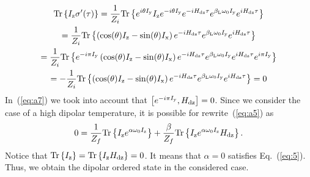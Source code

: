 \begin{multline}
    \label{eq:a7}
    \mathrm{Tr} \left\{ I_\mathrm{z} \sigma'(\tau) \right\}
    =  \dfrac{1}{Z_{i}} \mathrm{Tr} \left\{ 
        e^{i \theta I_\mathrm{y}} I_\mathrm{z} e^{-i \theta I_\mathrm{y}}
        e^{-i H_\mathrm{dz} \tau} e^{\beta_\mathrm{L} \omega_{0} I_\mathrm{y}} e^{i H_\mathrm{dz} \tau}
     \right\}
    \\
    = \dfrac{1}{Z_i} \mathrm{Tr} \left\{ 
        \left( \cos(\theta) I_\mathrm{z} - \sin(\theta) I_\mathrm{x} \right)
        e^{-i H_\mathrm{dz} \tau} e^{\beta_\mathrm{L} \omega_{0} I_\mathrm{y}} e^{i H_\mathrm{dz} \tau}
     \right\}
    \\
    = \dfrac{1}{Z_i} \mathrm{Tr} \left\{ 
        e^{-i \pi I_\mathrm{y}}
        \left( \cos(\theta) I_\mathrm{z} - \sin(\theta) I_\mathrm{x} \right)
        e^{-i H_\mathrm{dz} \tau} e^{\beta_\mathrm{L} \omega_{0} I_\mathrm{y}} e^{i H_\mathrm{dz} \tau}
        e^{i \pi I_\mathrm{y}}
     \right\}
    \\
    = - \dfrac{1}{Z_i} \mathrm{Tr} \left\{ 
        \left( \cos(\theta) I_\mathrm{z} - \sin(\theta) I_\mathrm{x} \right)
        e^{-i H_\mathrm{dz} \tau} e^{\beta_\mathrm{L} \omega_{0} I_\mathrm{y}} e^{i H_\mathrm{dz} \tau}
     \right\} = 0
\end{multline}
%
In~(\ref{eq:a7}) we took into account that $\left[ e^{-i \pi I_\mathrm{y}}, H_\mathrm{dz} \right] = 0$.
Since we consider the case of a high dipolar temperature, it is possible for rewrite~(\ref{eq:a5}) as
\begin{equation}
    \label{eq:a8}
    0 = \dfrac{1}{Z_f} \mathrm{Tr} \left\{  I_\mathrm{z} e^{\alpha \omega_0 I_\mathrm{z}} \right\}
    + \dfrac{\beta}{Z_f} \mathrm{Tr} \left\{ I_\mathrm{z} e^{\alpha \omega_0 I_\mathrm{z}} H_\mathrm{dz} \right\}.
\end{equation}
%
Notice that $\mathrm{Tr} \left\{ I_\mathrm{z} \right\} = \mathrm{Tr} \left\{ I_\mathrm{z}H_\mathrm{dz} \right\} = 0$. It means that $\alpha = 0$ satisfies Eq.~(\ref{eq:5}).
Thus, we obtain the dipolar ordered state in the considered case.




